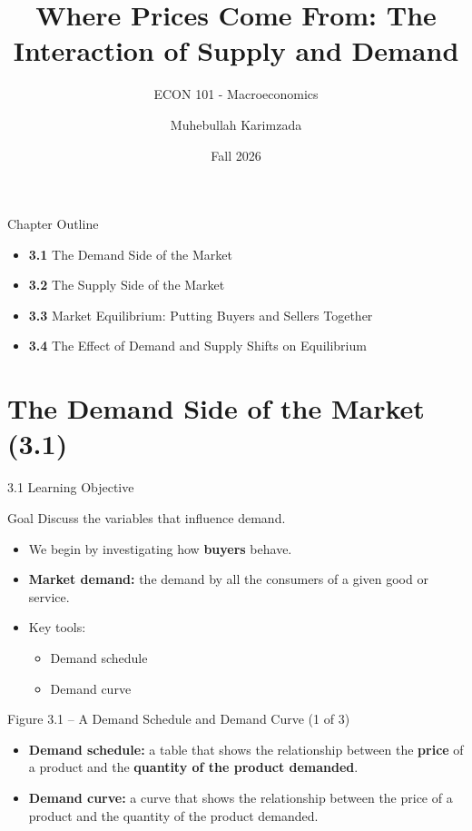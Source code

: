\documentclass[aspectratio=169]{beamer}
\title{\textbf{Where Prices Come From: The Interaction of Supply and Demand \vspace{.5cm}\\  }}
\subtitle{ {\large ECON 101 - Macroeconomics}}
\author{Muhebullah Karimzada}
\date{Fall 2026}
\begin{document}
\begin{frame}[plain]
  \titlepage
\end{frame}

\begin{frame}{Chapter Outline}
\transfade
\begin{itemize}[<+->]
  \item \textbf{3.1} The Demand Side of the Market
  \item \textbf{3.2} The Supply Side of the Market
  \item \textbf{3.3} Market Equilibrium: Putting Buyers and Sellers Together
  \item \textbf{3.4} The Effect of Demand and Supply Shifts on Equilibrium
\end{itemize}
\end{frame}

\section{The Demand Side of the Market (3.1)}

\begin{frame}{3.1 Learning Objective}
\transfade
\begin{block}{Goal}
Discuss the variables that influence demand.
\end{block}
\begin{itemize}[<+->]
  \item We begin by investigating how \textbf{buyers} behave.
  \item \textbf{Market demand:} the demand by all the consumers of a given good or service.
  \item Key tools:
  \begin{itemize}[<+->]
    \item Demand schedule
    \item Demand curve
  \end{itemize}
\end{itemize}
\end{frame}

\begin{frame}{Figure 3.1 -- A Demand Schedule and Demand Curve (1 of 3)}
\transfade
\begin{itemize}[<+->]
  \item \textbf{Demand schedule:} a table that shows the relationship between the \textbf{price} of a product and the \textbf{quantity of the product demanded}.
  \item \textbf{Demand curve:} a curve that shows the relationship between the price of a product and the quantity of the product demanded.
\end{itemize}
\end{frame}
\end{document}
